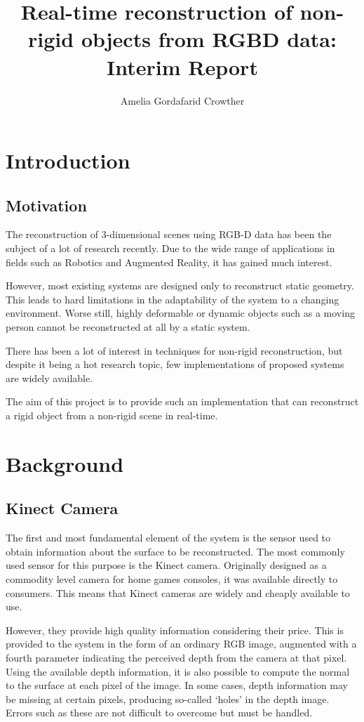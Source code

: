 \documentclass[a4paper]{article}
\title{Real-time reconstruction of non-rigid objects from RGBD data: Interim Report}
\author{Amelia Gordafarid Crowther}
\begin{document}
\maketitle
\section{Introduction}

\subsection{Motivation}

The reconstruction of 3-dimensional scenes using RGB-D data has been the subject of a lot of research recently. Due to the wide range of applications in fields such as Robotics and Augmented Reality, it has gained much interest.

However, most existing systems are designed only to reconstruct static geometry. This leads to hard limitations in the adaptability of the system to a changing environment. Worse still, highly deformable or dynamic objects such as a moving person cannot be reconstructed at all by a static system.

There has been a lot of interest in techniques for non-rigid reconstruction, but despite it being a hot research topic, few implementations of proposed systems are widely available. 

The aim of this project is to provide such an implementation that can reconstruct a rigid object from a  non-rigid scene in real-time.


\section{Background}

\subsection{Kinect Camera}

The first and most fundamental element of the system is the sensor used to obtain information about the surface to be reconstructed. The most commonly used sensor for this purpose is the Kinect camera. Originally designed as a commodity level camera for home games consoles, it was available directly to consumers. This means that Kinect cameras are widely and cheaply available to use.

However, they provide high quality information considering their price. This is provided to the system in the form of an ordinary RGB image, augmented with a fourth parameter indicating the perceived depth from the camera at that pixel. Using the available depth information, it is also possible to compute the normal to the surface at each pixel of the image. In some cases, depth information may be missing at certain pixels, producing so-called `holes' in the depth image. Errors such as these are not difficult to overcome but must be handled.
\end{document}
